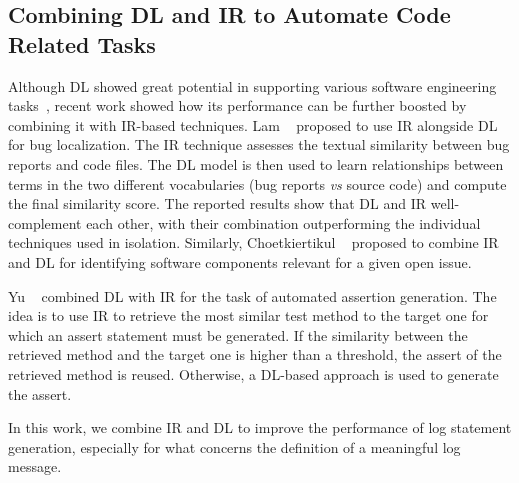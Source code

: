 \subsection{Combining DL and IR to Automate Code Related Tasks}
%
Although DL showed great potential in supporting various software engineering tasks~\cite{watsonSytematicLiterature2020}, recent work showed how its performance can be further boosted by combining it with IR-based techniques. Lam \etal~\cite{LamBugLocalization2017} proposed to use IR alongside DL for bug localization. The IR technique assesses the textual similarity between bug reports and code files. The DL model is then used to learn relationships between terms in the two different vocabularies (\ie bug reports \emph{vs} source code) and compute the final similarity score. The reported results show that DL and IR well-complement each other, with their combination outperforming the individual techniques used in isolation. Similarly, Choetkiertikul \etal~\cite{choetkiertikul2018predicting} proposed to combine IR and DL for identifying software components relevant for a given open issue.

Yu \etal~\cite{yu2022automated} combined DL with IR for the task of automated assertion generation. The idea is to use IR to retrieve the most similar test method to the target one for which an assert statement must be generated. If the similarity between the retrieved method and the target one is higher than a threshold, the assert of the retrieved method is reused. Otherwise, a DL-based approach is used to generate the assert.

In this work, we combine IR and DL to improve the performance of log statement generation, especially for what concerns the definition of a meaningful log message.